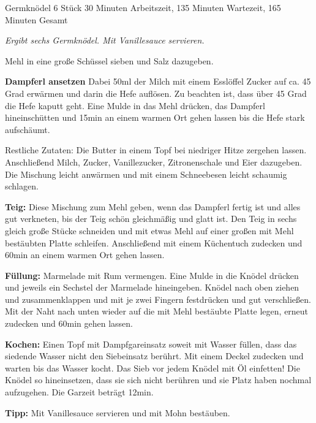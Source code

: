 \begin{recipe}{Germknödel} {6 Stück} {30 Minuten Arbeitszeit, 135 Minuten Wartezeit, 165 Minuten Gesamt}

  \freeform{}\textit{Ergibt sechs Germknödel. Mit Vanillesauce servieren.}


  Mehl in eine große Schüssel sieben und Salz dazugeben.

  \newstep{}\textbf{Dampferl ansetzen}
  Dabei 50ml der Milch mit einem Esslöffel Zucker auf ca. 45 Grad erwärmen und darin die Hefe auflösen.
  Zu beachten ist, dass über 45 Grad die Hefe kaputt geht.
  Eine Mulde in das Mehl drücken, das Dampferl hineinschütten und 15min an einem warmen Ort gehen lassen bis die Hefe stark aufschäumt.

  \newstep{}Restliche Zutaten: Die Butter in einem Topf bei niedriger Hitze zergehen lassen.
  Anschließend Milch, Zucker, Vanillezucker, Zitronenschale und Eier dazugeben.
  Die Mischung leicht anwärmen und mit einem Schneebesen leicht schaumig schlagen.

  \newstep{}\textbf{Teig:}
  Diese Mischung zum Mehl geben, wenn das Dampferl fertig ist und alles gut verkneten, bis der Teig schön gleichmäßig und glatt ist.
  Den Teig in sechs gleich große Stücke schneiden und mit etwas Mehl auf einer großen mit Mehl bestäubten Platte schleifen.
  Anschließend mit einem Küchentuch zudecken und 60min an einem warmen Ort gehen lassen.

  \newstep{}\textbf{Füllung:}
  Marmelade mit Rum vermengen.
  Eine Mulde in die Knödel drücken und jeweils ein Sechstel der Marmelade hineingeben.
  Knödel nach oben ziehen und zusammenklappen und mit je zwei Fingern festdrücken und gut verschließen.
  Mit der Naht nach unten wieder auf die mit Mehl bestäubte Platte legen, erneut zudecken und 60min gehen lassen.

  \newstep{}\textbf{Kochen:}
  Einen Topf mit Dampfgareinsatz soweit mit Wasser füllen, dass das siedende Wasser nicht den Siebeinsatz berührt.
  Mit einem Deckel zudecken und warten bis das Wasser kocht.
  Das Sieb vor jedem Knödel mit Öl einfetten!
  Die Knödel so hineinsetzen, dass sie sich nicht berühren und sie Platz haben nochmal aufzugehen.
  Die Garzeit beträgt 12min.

  \freeform{}\hrulefill{}

  \freeform{}\textbf{Tipp:}
  Mit Vanillesauce servieren und mit Mohn bestäuben.

  \end{recipe}
